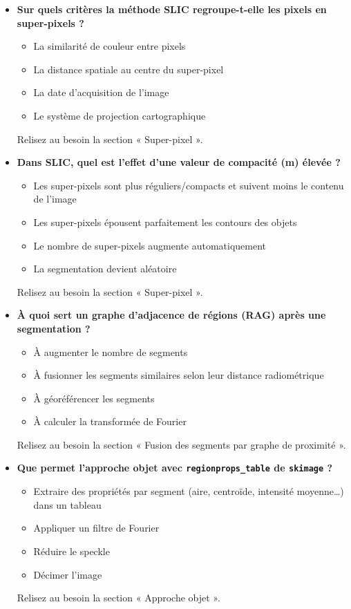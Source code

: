 \documentclass[
  french,
  11pt,
  letterpaper,
  open=any,
  twoside=false,
  french]{scrbook}
\providecommand{\tightlist}{%
  \setlength{\itemsep}{0pt}\setlength{\parskip}{0pt}}
\begin{document}
\begin{itemize}
  Relisez au besoin la section « Filtrage adaptatif ».
\item
  \textbf{Sur quels critères la méthode SLIC regroupe-t-elle les pixels
  en super-pixels ?}

  \begin{itemize}
  \tightlist
  \item
    La similarité de couleur entre pixels
  \item
    La distance spatiale au centre du super-pixel
  \item
    La date d'acquisition de l'image
  \item
    Le système de projection cartographique
  \end{itemize}

  Relisez au besoin la section « Super-pixel ».
\item
  \textbf{Dans SLIC, quel est l'effet d'une valeur de compacité (m)
  élevée ?}

  \begin{itemize}
  \tightlist
  \item
    Les super-pixels sont plus réguliers/compacts et suivent moins le
    contenu de l'image
  \item
    Les super-pixels épousent parfaitement les contours des objets
  \item
    Le nombre de super-pixels augmente automatiquement
  \item
    La segmentation devient aléatoire
  \end{itemize}

  Relisez au besoin la section « Super-pixel ».
\item
  \textbf{À quoi sert un graphe d'adjacence de régions (RAG) après une
  segmentation ?}

  \begin{itemize}
  \tightlist
  \item
    À augmenter le nombre de segments
  \item
    À fusionner les segments similaires selon leur distance
    radiométrique
  \item
    À géoréférencer les segments
  \item
    À calculer la transformée de Fourier
  \end{itemize}

  Relisez au besoin la section « Fusion des segments par graphe de
  proximité ».
\item
  \textbf{Que permet l'approche objet avec \texttt{regionprops\_table}
  de \texttt{skimage} ?}

  \begin{itemize}
  \tightlist
  \item
    Extraire des propriétés par segment (aire, centroïde, intensité
    moyenne\ldots) dans un tableau
  \item
    Appliquer un filtre de Fourier
  \item
    Réduire le speckle
  \item
    Décimer l'image
  \end{itemize}

  Relisez au besoin la section « Approche objet ».
\end{itemize}
\end{document}
